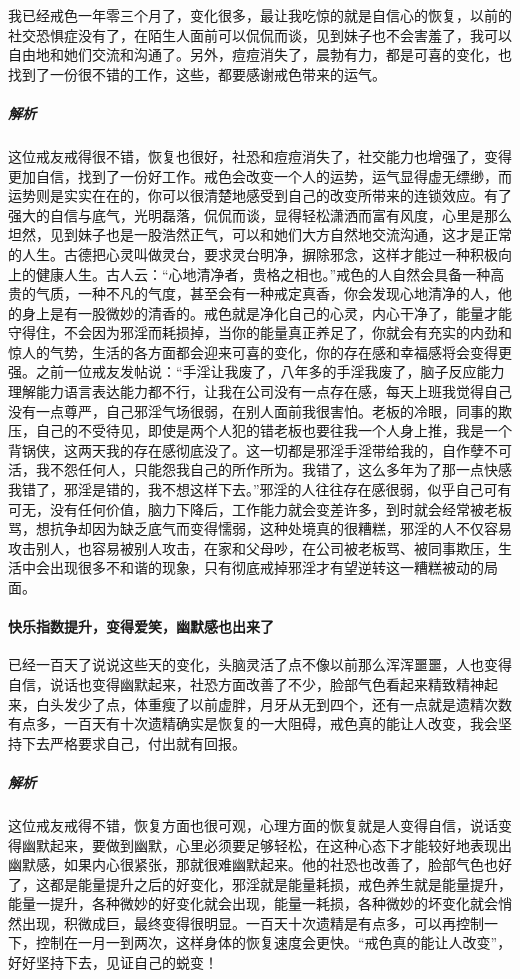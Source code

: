 \begin{case}
    我已经戒色一年零三个月了，变化很多，最让我吃惊的就是自信心的恢复，以前的社交恐惧症没有了，在陌生人面前可以侃侃而谈，见到妹子也不会害羞了，我可以自由地和她们交流和沟通了。另外，痘痘消失了，晨勃有力，都是可喜的变化，也找到了一份很不错的工作，这些，都要感谢戒色带来的运气。
    \subparagraph{解析} 这位戒友戒得很不错，恢复也很好，社恐和痘痘消失了，社交能力也增强了，变得更加自信，找到了一份好工作。戒色会改变一个人的运势，运气显得虚无缥缈，而运势则是实实在在的，你可以很清楚地感受到自己的改变所带来的连锁效应。有了强大的自信与底气，光明磊落，侃侃而谈，显得轻松潇洒而富有风度，心里是那么坦然，见到妹子也是一股浩然正气，可以和她们大方自然地交流沟通，这才是正常的人生。古德把心灵叫做灵台，要求灵台明净，摒除邪念，这样才能过一种积极向上的健康人生。古人云：“心地清净者，贵格之相也。”戒色的人自然会具备一种高贵的气质，一种不凡的气度，甚至会有一种戒定真香，你会发现心地清净的人，他的身上是有一股微妙的清香的。戒色就是净化自己的心灵，内心干净了，能量才能守得住，不会因为邪淫而耗损掉，当你的能量真正养足了，你就会有充实的内劲和惊人的气势，生活的各方面都会迎来可喜的变化，你的存在感和幸福感将会变得更强。之前一位戒友发帖说：“手淫让我废了，八年多的手淫我废了，脑子反应能力理解能力语言表达能力都不行，让我在公司没有一点存在感，每天上班我觉得自己没有一点尊严，自己邪淫气场很弱，在别人面前我很害怕。老板的冷眼，同事的欺压，自己的不受待见，即使是两个人犯的错老板也要往我一个人身上推，我是一个背锅侠，这两天我的存在感彻底没了。这一切都是邪淫手淫带给我的，自作孽不可活，我不怨任何人，只能怨我自己的所作所为。我错了，这么多年为了那一点快感我错了，邪淫是错的，我不想这样下去。”邪淫的人往往存在感很弱，似乎自己可有可无，没有任何价值，脑力下降后，工作能力就会变差许多，到时就会经常被老板骂，想抗争却因为缺乏底气而变得懦弱，这种处境真的很糟糕，邪淫的人不仅容易攻击别人，也容易被别人攻击，在家和父母吵，在公司被老板骂、被同事欺压，生活中会出现很多不和谐的现象，只有彻底戒掉邪淫才有望逆转这一糟糕被动的局面。
\end{case}

\paragraph{快乐指数提升，变得爱笑，幽默感也出来了}

\begin{case}
    已经一百天了说说这些天的变化，头脑灵活了点不像以前那么浑浑噩噩，人也变得自信，说话也变得幽默起来，社恐方面改善了不少，脸部气色看起来精致精神起来，白头发少了点，体重瘦了以前虚胖，月牙从无到四个，还有一点就是遗精次数有点多，一百天有十次遗精确实是恢复的一大阻碍，戒色真的能让人改变，我会坚持下去严格要求自己，付出就有回报。
    \subparagraph{解析} 这位戒友戒得不错，恢复方面也很可观，心理方面的恢复就是人变得自信，说话变得幽默起来，要做到幽默，心里必须要足够轻松，在这种心态下才能较好地表现出幽默感，如果内心很紧张，那就很难幽默起来。他的社恐也改善了，脸部气色也好了，这都是能量提升之后的好变化，邪淫就是能量耗损，戒色养生就是能量提升，能量一提升，各种微妙的好变化就会出现，能量一耗损，各种微妙的坏变化就会悄然出现，积微成巨，最终变得很明显。一百天十次遗精是有点多，可以再控制一下，控制在一月一到两次，这样身体的恢复速度会更快。“戒色真的能让人改变”，好好坚持下去，见证自己的蜕变！
\end{case}

